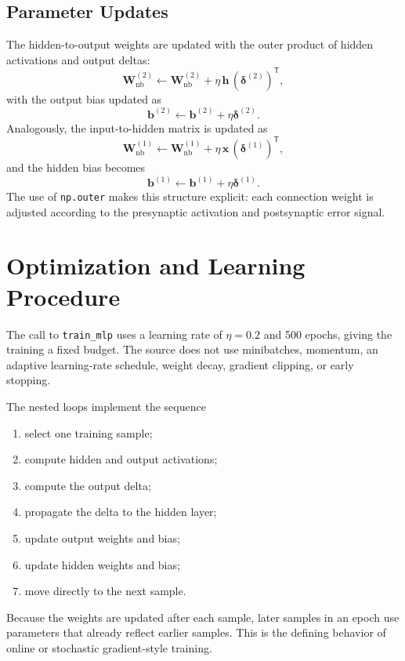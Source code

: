 \documentclass[11pt,a4paper]{article}
\newcommand{\code}[1]{\texttt{\small #1}}
\begin{document}
\subsection{Parameter Updates}
The hidden-to-output weights are updated with the outer product of hidden activations and output deltas:
\begin{equation}
\mathbf{W}^{(2)}_{\mathrm{nb}}\leftarrow
\mathbf{W}^{(2)}_{\mathrm{nb}}
+\eta\,\mathbf{h}\,(\boldsymbol{\delta}^{(2)})^{\mathsf T},
\end{equation}
with the output bias updated as
\begin{equation}
\mathbf{b}^{(2)}\leftarrow\mathbf{b}^{(2)}+\eta\boldsymbol{\delta}^{(2)}.
\end{equation}
Analogously, the input-to-hidden matrix is updated as
\begin{equation}
\mathbf{W}^{(1)}_{\mathrm{nb}}\leftarrow
\mathbf{W}^{(1)}_{\mathrm{nb}}
+\eta\,\mathbf{x}\,(\boldsymbol{\delta}^{(1)})^{\mathsf T},
\end{equation}
and the hidden bias becomes
\begin{equation}
\mathbf{b}^{(1)}\leftarrow\mathbf{b}^{(1)}+\eta\boldsymbol{\delta}^{(1)}.
\end{equation}
The use of \code{np.outer} makes this structure explicit: each connection weight is adjusted according to the presynaptic activation and postsynaptic error signal.

\section{Optimization and Learning Procedure}
The call to \code{train\_mlp} uses a learning rate of \(\eta=0.2\) and 500 epochs, giving the training a fixed budget. The source does not use minibatches, momentum, an adaptive learning-rate schedule, weight decay, gradient clipping, or early stopping.

The nested loops implement the sequence
\begin{enumerate}
\item select one training sample;
\item compute hidden and output activations;
\item compute the output delta;
\item propagate the delta to the hidden layer;
\item update output weights and bias;
\item update hidden weights and bias;
\item move directly to the next sample.
\end{enumerate}
Because the weights are updated after each sample, later samples in an epoch use parameters that already reflect earlier samples. This is the defining behavior of online or stochastic gradient-style training.
\end{document}
